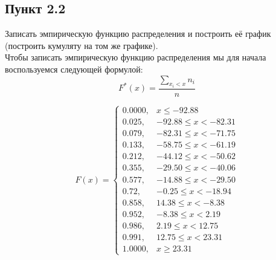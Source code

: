 \documentclass[12pt]{article}
\begin{document}
\subsection*{Пункт 2.2}
Записать эмпирическую функцию распределения и построить её график (построить кумуляту на том же графике).\\
\vspace{5mm}
Чтобы записать эмпирическую функцию распределения мы для начала воспользуемся следующей формулой:
$$ F^* (x) = \frac{\sum_{x_i<x} n_i}{n} $$

\[ F(x) = \begin{cases} 0.0000, & x \leq -92.88 \\
0.025, & -92.88 \leq x < -82.31 \\
0.079, & -82.31 \leq x < -71.75 \\
0.133, & -58.75 \leq x < -61.19 \\
0.212, & -44.12 \leq x < -50.62 \\
0.355, & -29.50 \leq x < -40.06 \\
0.577, & -14.88 \leq x < -29.50 \\
0.72, & -0.25 \leq x < -18.94 \\
0.858, & 14.38 \leq x < -8.38 \\
0.952, & -8.38 \leq x < 2.19 \\ 
0.986, & 2.19 \leq x < 12.75 \\
0.991, & 12.75 \leq x < 23.31\\
1.0000, & x \geq 23.31 
\end{cases} \]
\vspace{5mm}

\\
\\
\raggedright
\end{document}
